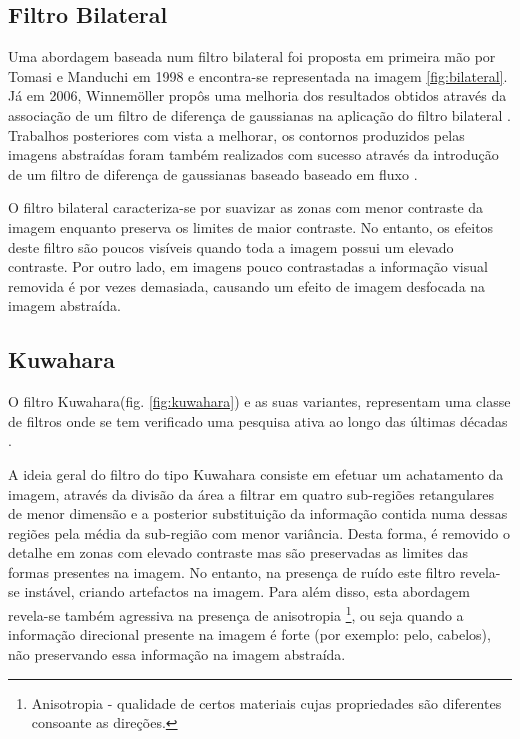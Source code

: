 \subsection{Filtro Bilateral}
Uma abordagem baseada num filtro bilateral foi proposta em primeira mão por Tomasi e Manduchi em 1998 \cite{Tomasi1998} e encontra-se representada na imagem \ref{fig:bilateral}. Já em 2006, Winnemöller propôs uma melhoria dos resultados obtidos através da associação de um filtro de diferença de gaussianas na aplicação do filtro bilateral \cite{Winnemoller2006}. Trabalhos posteriores com vista a melhorar, os contornos produzidos pelas imagens abstraídas foram também realizados com sucesso através da introdução de um filtro de diferença de gaussianas baseado baseado em fluxo \cite{Kang2009}.

O filtro bilateral caracteriza-se por suavizar as zonas com menor contraste da imagem enquanto preserva os limites de maior contraste. No entanto, os efeitos deste filtro são poucos visíveis quando toda a imagem possui um elevado contraste. Por outro lado, em imagens pouco contrastadas a informação visual removida é por vezes demasiada, causando um efeito de imagem desfocada na imagem abstraída.

\subsection{Kuwahara} \label{subsec:kuwahara}
O filtro Kuwahara(fig. \ref{fig:kuwahara}) e as suas variantes, representam uma classe de filtros onde se tem verificado uma pesquisa ativa ao longo das últimas décadas \cite{Kyprianidis2009}.

A ideia geral do filtro do tipo Kuwahara consiste em efetuar um achatamento da imagem, através da divisão da área a filtrar em quatro sub-regiões retangulares de menor dimensão e a posterior substituição da informação contida numa dessas regiões pela média da sub-região com menor variância. Desta forma, é removido o detalhe em zonas com elevado contraste mas são preservadas as limites das formas presentes na imagem. No entanto, na presença de ruído este filtro revela-se instável, criando artefactos na imagem. Para além disso, esta abordagem revela-se também agressiva na presença de anisotropia \footnote{Anisotropia - qualidade de certos materiais cujas propriedades são diferentes consoante as direções.}, ou seja quando a informação direcional presente na imagem é forte (por exemplo: pelo, cabelos), não preservando essa informação na imagem abstraída.

